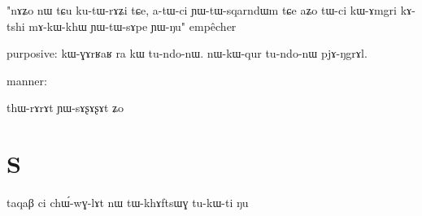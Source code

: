 \documentclass[oldfontcommands,oneside,a4paper,11pt]{article}
\newcommand{\ipa}[1]{{\phon #1}} %
\begin{document}
"nɤʑo nɯ tɕu ku-tɯ-rɤʑi tɕe, a-tɯ-ci ɲɯ-tɯ-sqarndɯm tɕe aʑo
tɯ-ci kɯ-ɤmgri kɤ-tshi mɤ-kɯ-khɯ ɲɯ-tɯ-sɤpe ɲɯ-ŋu"
empêcher

purposive:
kɯ-ɣɤrʁaʁ ra kɯ tu-ndo-nɯ.
nɯ-kɯ-qur tu-ndo-nɯ pjɤ-ŋgrɤl.

  
 
manner:

thɯ-rɤrɤt ɲɯ-sɤʂɤʂɤt ʑo

\section{S}

\ipa{taqaβ} 	\ipa{ci} 	\ipa{chɯ́-wɣ-lɤt} 	\ipa{nɯ} 	\ipa{tɯ-khɤftsɯɣ} 	\ipa{tu-kɯ-ti} 	\ipa{ŋu} 




\end{document}

